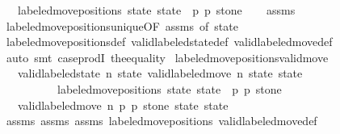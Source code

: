 \begin{isabellebody}
\ \ \ {\isachardoublequoteopen}labeled{\isacharunderscore}move{\isacharunderscore}positions\ state\ state{\isacharprime}\ {\isacharequal}\ {\isacharparenleft}p{}{\isacharcomma}\ p{}{\isacharcomma}\ stone{\isacharparenright}{\isachardoublequoteclose}\isanewline
%
\isadelimproof
\ \ %
\endisadelimproof
%
\isatagproof
{}\isamarkupfalse%
\ assms\isanewline
\ \ \isamarkupfalse%
\ labeled{\isacharunderscore}move{\isacharunderscore}positions{\isacharunderscore}unique{\isacharbrackleft}OF\ assms{\isacharparenleft}{}{\isacharparenright}{\isacharcomma}\ of\ state{\isacharprime}{\isacharbrackright}\isanewline
\ \ \isamarkupfalse%
\ labeled{\isacharunderscore}move{\isacharunderscore}positions{\isacharunderscore}def\ valid{\isacharunderscore}labeled{\isacharunderscore}state{\isacharunderscore}def\ valid{\isacharunderscore}labeled{\isacharunderscore}move{\isacharunderscore}def\isanewline
\ \ \isamarkupfalse%
\ auto\ {\isacharparenleft}smt\ case{\isacharunderscore}prodI\ the{\isacharunderscore}equality{\isacharparenright}%
\endisatagproof
{\isafoldproof}%
%
\isadelimproof
\isanewline
%
\endisadelimproof
\isanewline
{}\isamarkupfalse%
\ labeled{\isacharunderscore}move{\isacharunderscore}positions{\isacharunderscore}valid{\isacharunderscore}move{\isacharprime}{\isacharcolon}\isanewline
\ \ \ {\isachardoublequoteopen}valid{\isacharunderscore}labeled{\isacharunderscore}state\ n\ state{\isachardoublequoteclose}\ {\isachardoublequoteopen}valid{\isacharunderscore}labeled{\isacharunderscore}move\ n\ state\ state{\isacharprime}{\isachardoublequoteclose}\isanewline
\ \ \ \ \ \ \ \ \ \ {\isachardoublequoteopen}labeled{\isacharunderscore}move{\isacharunderscore}positions\ state\ state{\isacharprime}\ {\isacharequal}\ {\isacharparenleft}p{}{\isacharcomma}\ p{}{\isacharcomma}\ stone{\isacharparenright}{\isachardoublequoteclose}\isanewline
\ \ \ {\isachardoublequoteopen}valid{\isacharunderscore}labeled{\isacharunderscore}move{\isacharprime}\ n\ p{}\ p{}\ stone\ state\ state{\isacharprime}{\isachardoublequoteclose}\isanewline
%
\isadelimproof
\ \ %
\endisadelimproof
%
\isatagproof
{}\isamarkupfalse%
\ assms{\isacharparenleft}{}{\isacharparenright}\ assms{\isacharparenleft}{}{\isacharparenright}\ assms{\isacharparenleft}{}{\isacharparenright}\ labeled{\isacharunderscore}move{\isacharunderscore}positions\ valid{\isacharunderscore}labeled{\isacharunderscore}move{\isacharunderscore}def\isanewline

\end{isabellebody}
